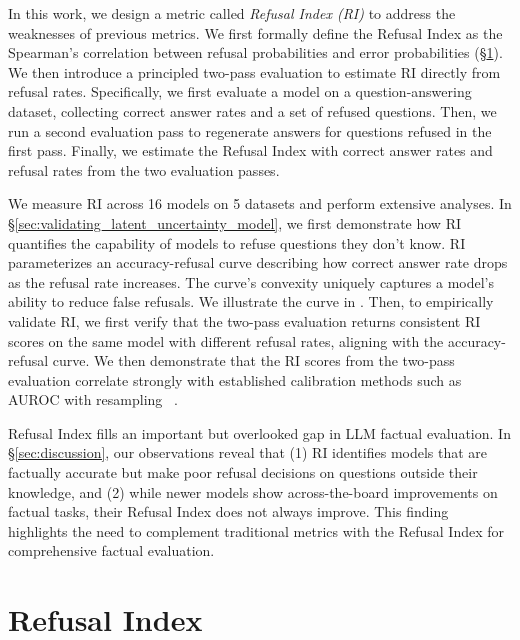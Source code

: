 \documentclass{article} %
\theoremstyle{definition}
\begin{document}
In this work, we design a metric called \emph{Refusal Index (RI)} to address the weaknesses of previous metrics. 
We first formally define the Refusal Index as the Spearman's correlation between refusal probabilities and error probabilities (\S\ref{sec:refusal_index_method}). 
We then introduce a principled two-pass evaluation to estimate RI directly from refusal rates. 
Specifically, we first evaluate a model on a question-answering dataset, collecting correct answer rates and a set of refused questions. 
Then, we run a second evaluation pass to regenerate answers for questions refused in the first pass. 
Finally, we estimate the Refusal Index with correct answer rates and refusal rates from the two evaluation passes. 

We measure RI across 16 models on 5 datasets and perform extensive analyses. 
In \S\ref{sec:validating_latent_uncertainty_model}, we first demonstrate how RI quantifies the capability of models to refuse questions they don't know. 
RI parameterizes an accuracy-refusal curve describing how correct answer rate drops as the refusal rate increases. 
The curve’s convexity uniquely captures a model’s ability to reduce false refusals. We illustrate the curve in .
Then, to empirically validate RI, we first verify that the two-pass evaluation returns consistent RI scores on the same model with different refusal rates, aligning with the accuracy-refusal curve. 
We then demonstrate that the RI scores from the two-pass evaluation correlate strongly with established calibration methods such as AUROC with resampling ~\citep{kadavathLanguageModelsMostly2022,ulmerCalibratingLargeLanguage2024}.

Refusal Index fills an important but overlooked gap in LLM factual evaluation. 
In \S\ref{sec:discussion}, our observations reveal that (1) RI identifies models that are factually accurate but make poor refusal decisions on questions outside their knowledge, and (2) while newer models show across-the-board improvements on factual tasks, their Refusal Index does not always improve. 
This finding highlights the need to complement traditional metrics with the Refusal Index for comprehensive factual evaluation.

\section{Refusal Index}
\label{sec:refusal_index_method}

\end{document}
